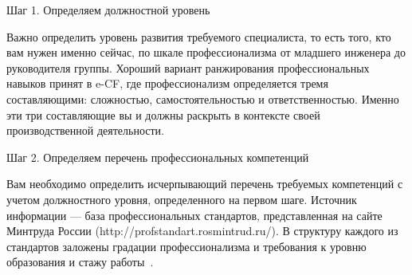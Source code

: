 \documentclass{../industrial-development}
\begin{document}
\lecturenotes

\alert{Шаг 1. Определяем должностной уровень}

Важно определить уровень развития требуемого специалиста, то есть того, кто вам нужен именно сейчас, по шкале профессионализма от младшего инженера до руководителя группы. Хороший вариант ранжирования профессиональных навыков принят в e-CF, где профессионализм определяется тремя составляющими: сложностью, самостоятельностью и ответственностью. Именно эти три составляющие вы и должны раскрыть в контексте своей производственной деятельности.

\alert{Шаг 2. Определяем перечень профессиональных компетенций}

Вам необходимо определить исчерпывающий перечень требуемых компетенций с учетом должностного уровня, определенного на первом шаге. Источник информации — база профессиональных стандартов, представленная на сайте Минтруда России (http://profstandart.rosmintrud.ru/). В структуру каждого из стандартов заложены градации профессионализма и требования к уровню образования и стажу работы~\cite[с.~280]{Pererva}.


\end{document}
